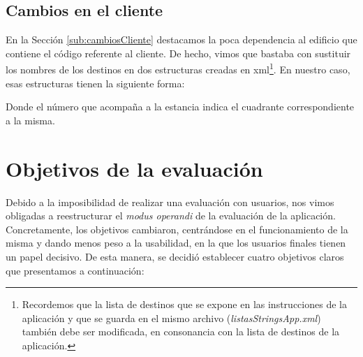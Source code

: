 %
%



\subsection{Cambios en el cliente}
\label{sub:cambiosCliente_vivienda}

En la Sección \ref{sub:cambiosCliente} destacamos la poca dependencia al edificio que contiene el código referente al cliente. De hecho, vimos que bastaba con sustituir los nombres de los destinos en dos estructuras creadas en xml\footnote{Recordemos que la lista de destinos que se expone en las instrucciones de la aplicación y que se guarda en el mismo archivo (\textit{listasStringsApp.xml}) también debe ser modificada, en consonancia con la lista de destinos de la aplicación.}. En nuestro caso, esas estructuras tienen la siguiente forma: 





Donde el número que acompaña a la estancia indica el cuadrante correspondiente a la misma.

\section{Objetivos de la evaluación}
\label{sec:objetivosEval}

Debido a la imposibilidad de realizar una evaluación con usuarios, nos vimos obligadas a reestructurar el \textit{modus operandi} de la evaluación de la aplicación. Concretamente, los objetivos cambiaron, centrándose en el funcionamiento de la misma y dando menos peso a la usabilidad, en la que los usuarios finales tienen un papel decisivo. De esta manera, se decidió establecer cuatro objetivos claros que presentamos a continuación:

